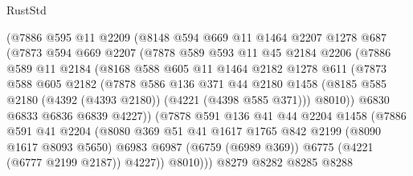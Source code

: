 \begin{lexlean}{RustStd}
\begin{coremodule}
{\begin{coremodule}
{{{{{{{{{{{{{{{{{{{{{{{{{{{{{{{              (@7886
                @595
                @11
                @2209
                (@8148
                  @594
                  @669
                  @11
                  @1464
                  @2207
                  @1278
                  @687
                  (@7873
                    @594
                    @669
                    @2207
                    (@7878
                      @589
                      @593
                      @11
                      @45
                      @2184
                      @2206
                      (@7886
                        @589
                        @11
                        @2184
                        (@8168
                          @588
                          @605
                          @11
                          @1464
                          @2182
                          @1278
                          @611
                          (@7873
                            @588
                            @605
                            @2182
                            (@7878
                              @586
                              @136
                              @371
                              @44
                              @2180
                              @1458
                              (@8185 @585 @2180 (@4392 (@4393 @2180)) (@4221 (@4398 @585 @371)))
                              @8010))
                          @6830
                          @6833
                          @6836
                          @6839
                          @4227))
                      (@7878
                        @591
                        @136
                        @41
                        @44
                        @2204
                        @1458
                        (@7886
                          @591
                          @41
                          @2204
                          (@8080
                            @369
                            @51
                            @41
                            @1617
                            @1765
                            @842
                            @2199
                            (@8090 @1617 @8093 @5650)
                            @6983
                            @6987
                            (@6759 (@6989 @369))
                            @6775
                            (@4221 (@6777 @2199 @2187))
                            @4227))
                        @8010)))
                  @8279
                  @8282
                  @8285
                  @8288
}}}}}}}}}}}}}}}}}}}}}}}}}}}}}}}
\end{coremodule}}
\end{coremodule}
\end{lexlean}
